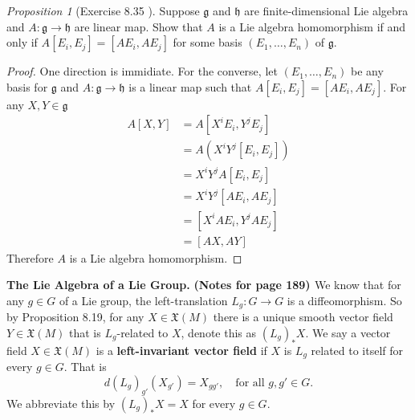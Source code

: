 \documentclass[a4paper]{article}
\theoremstyle{remark}
\newtheorem{prop}{Proposition}
\newcommand{\VF}{\mathfrak{X}} %
\newcommand{\glie}{\mathfrak{g}} %
\newcommand{\hlie}{\mathfrak{h}} %
\begin{document}
\begin{prop}[Exercise 8.35 \cite{LeeSM}]
Suppose $\glie$ and $\hlie$ are finite-dimensional Lie algebra and $A : \glie \to \hlie$ are linear map. Show that $A$ is a Lie algebra homomorphism if and only if $A[E_i,E_j] = [AE_i,AE_j]$ for some basis $(E_1,\dots,E_n)$ of $\glie$.
\end{prop}
\begin{proof}
One direction is immidiate. For the converse, let $(E_1,\dots,E_n)$ be any basis for $\glie$ and $A : \glie \to \hlie$ is a linear map such that $A[E_i,E_j] = [AE_i,AE_j]$. For any $X,Y \in \glie$
\begin{align*}
A[X,Y] &= A[X^iE_i,Y^jE_j] \\ &= A( X^iY^j[E_i,E_j]) \\ &= X^iY^j A[E_i,E_j]\\ &= X^iY^j [AE_i,AE_j] \\
&= [X^iAE_i,Y^jAE_j] \\
&= [AX,AY]  
\end{align*}
Therefore $A$ is a Lie algebra homomorphism.
\end{proof}

\textbf{The Lie Algebra of a Lie Group.} \textbf{(Notes for page 189) \cite{LeeSM}}  We know that for any  $g \in G$ of a Lie group, the left-translation $L_g : G \to G $ is a diffeomorphism. So by Proposition 8.19, for any $X \in \VF(M)$ there is a unique smooth vector field $Y \in \VF(M)$ that is $L_g$-related to $X$, denote this as $(L_g)_* X$. We say a vector field $X \in \VF(M)$ is a \textbf{left-invariant vector field} if $X$ is $L_g$ related to itself for every $g \in G$. That is 
$$
d(L_g)_{g'} (X_{g'}) = X_{gg'}, \quad \text{for all }g,g' \in G.
$$ 
We abbreviate this by $(L_g)_{*}X=X$ for every $g \in G$.
\end{document}
